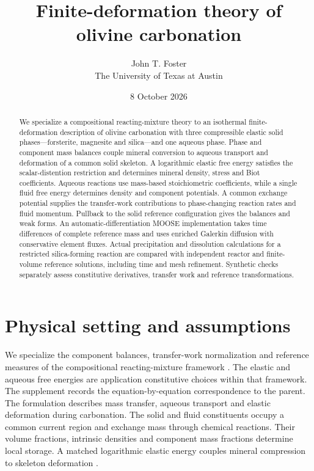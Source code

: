 \documentclass[11pt]{article}
\title{Finite-deformation theory of olivine carbonation}
\author{John T. Foster\\The University of Texas at Austin}
\date{8 October 2026}
\begin{document}
\maketitle
\begin{abstract}
We specialize a compositional reacting-mixture theory to an isothermal finite-deformation description of olivine carbonation with three compressible elastic solid phases---forsterite, magnesite and silica---and one aqueous phase. Phase and component mass balances couple mineral conversion to aqueous transport and deformation of a common solid skeleton. A logarithmic elastic free energy satisfies the scalar-distention restriction and determines mineral density, stress and Biot coefficients. Aqueous reactions use mass-based stoichiometric coefficients, while a single fluid free energy determines density and component potentials. A common exchange potential supplies the transfer-work contributions to phase-changing reaction rates and fluid momentum. Pullback to the solid reference configuration gives the balances and weak forms. An automatic-differentiation MOOSE implementation takes time differences of complete reference mass and uses enriched Galerkin diffusion with conservative element fluxes. Actual precipitation and dissolution calculations for a restricted silica-forming reaction are compared with independent reactor and finite-volume reference solutions, including time and mesh refinement. Synthetic checks separately assess constitutive derivatives, transfer work and reference transformations.
\end{abstract}

\section{Physical setting and assumptions}
We specialize the component balances, transfer-work normalization and reference measures of the compositional reacting-mixture framework \citep{compositional}. The elastic and aqueous free energies are application constitutive choices within that framework. The supplement records the equation-by-equation correspondence to the parent. The formulation describes mass transfer, aqueous transport and elastic deformation during carbonation. The solid and fluid constituents occupy a common current region and exchange mass through chemical reactions. Their volume fractions, intrinsic densities and component mass fractions determine local storage. A matched logarithmic elastic energy couples mineral compression to skeleton deformation \citep{matchedlog}.
\end{document}
